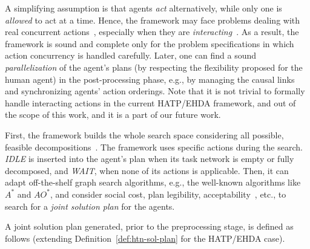 \documentclass[letterpaper]{article} %
\begin{document}
A simplifying assumption is that agents \textit{act} alternatively, while only one is \textit{allowed} to act at a time.
Hence, the framework may face problems dealing with real concurrent actions~\cite{CrosbyJR14}, especially when they are \textit{interacting}~\cite{ShekharB20}. 
As a result, the framework is sound and complete only for the problem specifications in which action concurrency is handled carefully. 
Later, one can find a sound \textit{parallelization} of the agent's plans (by respecting the flexibility proposed for the human agent) in the post-processing phase, e.g., by managing the causal links and synchronizing agents' action orderings. 
Note that it is not trivial to formally handle interacting actions in the current HATP/EHDA framework, and out of the scope of this work, and it is a part of our future work.  

First, the framework builds the whole search space considering all possible, feasible decompositions~\cite{buisan:hal-03684211}. 
The framework uses specific actions during the search.
{\em IDLE} is inserted into the agent's plan when its task network is empty or fully decomposed, and {\em WAIT}, when none of its actions is applicable.
Then, it can adapt off-the-shelf graph search algorithms, e.g., the well-known algorithms like $A^*$ and $AO^*$, and consider social cost, plan legibility, acceptability~\cite{alili2009task}, etc., to search for a \textit{joint solution plan} for the agents. 

A joint solution plan generated, prior to the preprocessing stage, is defined as follows (extending Definition~\ref{def:htn-sol-plan} for the HATP/EHDA case).
\end{document}
